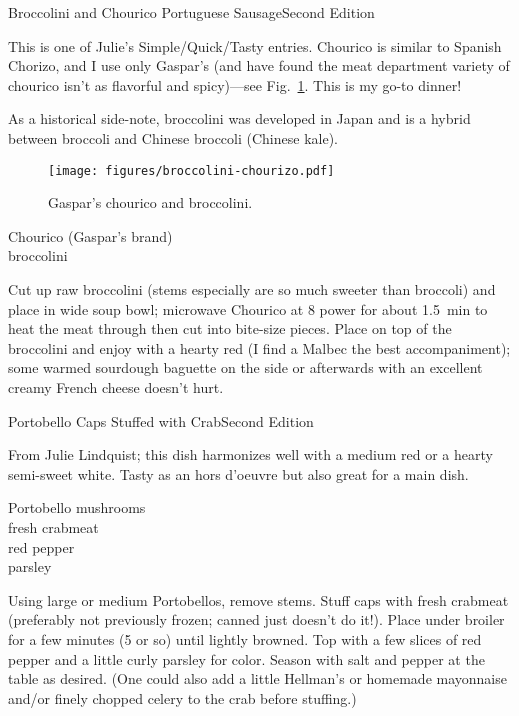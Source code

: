 \begin{entry}{Broccolini and Chourico Portuguese Sausage}{Second Edition}

\begin{open}
    This is one of Julie's Simple/Quick/Tasty entries.  Chourico is similar to
    Spanish Chorizo, and I use only Gaspar’s (and have found the meat department
    variety of chourico isn’t as flavorful and spicy)---see
    Fig.~\ref{fig:chourico}. This is my go-to dinner!

    As a historical side-note, broccolini was developed in Japan and is a hybrid
    between broccoli and Chinese broccoli (Chinese kale).
\end{open}
\begin{figure}
  \centering
  \texttt{[image: figures/broccolini-chourizo.pdf]}
  \caption{Gaspar's chourico and broccolini.}
  \label{fig:chourico}
\end{figure}
\begin{ingredients}
    Chourico (Gaspar's brand)\\
    broccolini
\end{ingredients}
Cut up raw broccolini (stems especially are so much sweeter than broccoli) and
place in wide soup bowl; microwave Chourico at 8 power for about
\SI{1.5}{\minute} to heat the meat through then cut into bite-size pieces.
Place on top of the broccolini and enjoy with a hearty red (I find a Malbec the
best accompaniment); some warmed sourdough baguette on the side or afterwards
with an excellent creamy French cheese doesn’t hurt.
\end{entry}

\begin{entry}{Portobello Caps Stuffed with Crab}{Second Edition}

\begin{open}
  From Julie Lindquist; this dish harmonizes well with a medium red or a
  hearty semi-sweet white. Tasty as an hors d'oeuvre but also great for a main
  dish.
\end{open}
\begin{ingredients}
    Portobello mushrooms\\
    fresh crabmeat\\
    red pepper\\
    parsley
\end{ingredients}
Using large or medium Portobellos, remove stems. Stuff caps with fresh
crabmeat (preferably not previously frozen; canned just doesn't do it!). Place
under broiler for a few minutes (5 or so) until lightly browned. Top with a
few slices of red pepper and a little curly parsley for color. Season with
salt and pepper at the table as desired.  (One could also add a little
Hellman’s or homemade mayonnaise and/or finely chopped celery to the crab
before stuffing.)
\end{entry}

